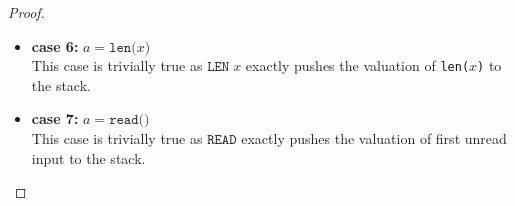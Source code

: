 \documentclass{article}
\begin{document}
\begin{proof}
\begin{itemize}
  Suppose $\mathit{LF}(lst; i_1, \dots, i_d)) = j$ for some $j \in \textbf{AExp}$ and assume for an induction on the correctness of the compilation of $j$. 

    \[
      \begin{aligned}
        \langle  \mathcal{CA}(a) : c,\, e,\, \sigma,\, s,\, pc \rangle 
        &= \langle \mathcal{CA}(lst\texttt{[$i_1$]}\dots\texttt{[$i_d$]}) : c,\, e,\, \sigma,\, s,\, pc \rangle \\
        &= \langle \mathcal{CA}(\mathit{LF}(lst; i_1, \dots, i_d)) : \texttt{LLOAD}\;lst : c,\, e,\, \sigma,\, s,\, pc \rangle 
        && \text{(definition of } \mathcal{CA}\text{)} \\
        &= \langle \mathcal{CA}(j) : \texttt{LLOAD}\;lst : c,\, e,\, \sigma,\, s,\, pc \rangle 
        && \text{(assumption)} \\
        &\triangleright^\ast \langle \texttt{LLOAD}\;lst : c,\, \mathcal{A}(j, \sigma, s):  e,\, \sigma,\, s,\, pc + l_j \rangle 
        && \text{(induction hypothesis)} \\
        &\triangleright \langle c,\, \sigma(lst\texttt{[$\mathcal{A}(j, \sigma, s)$]}, s):  e,\, \sigma,\, s,\, pc + l_j + 1 \rangle
        && \text{(operational semantics)} \\
        &= \langle c,\, \sigma(lst\texttt{[$\mathcal{A}(\mathit{LF}(lst\;; i_1, \dots, i_d), \sigma, s)$]}, s):  e,\, \sigma,\, s,\, pc + l_j + 1 \rangle
        && \text{(definition of } \mathit{LF}\text{)} \\
        &= \langle c,\, \mathcal{A}(lst\texttt{[$\mathcal{A}(i_1, \sigma, s)$]}\dots\texttt{[$\mathcal{A}(i_d, \sigma, s)$]}, \sigma, s) : e,\, \sigma,\, s,\, pc+1 \rangle 
        && \text{(list flattening)} \\
        &= \langle c,\, \mathcal{A}(lst\texttt{[$i_1$]}\dots\texttt{[$i_d$]}, \sigma, s) : e,\, \sigma,\, s,\, pc+1 \rangle
        && \text{(definition of } \mathcal{A}\text{)} \\
        &= \langle c,\, \mathcal{A}(a, \sigma, s) : e,\, \sigma,\, s,\, pc+1 \rangle \\
      \end{aligned}
  \]

    \item \textbf{case 6: } $a = \texttt{len($x$)}$ \\
    This case is trivially true as $\texttt{LEN}\;x$ exactly pushes the valuation of \texttt{len($x$)} to the stack.

    \item \textbf{case 7: } $a = \texttt{read()}$ \\
    This case is trivially true as $\texttt{READ}$ exactly pushes the valuation of first unread input to the stack.


\end{itemize}
\end{proof}
\end{document}

